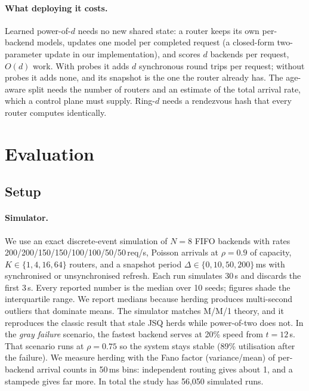 \documentclass[10pt,twocolumn,letterpaper]{article}
\begin{document}
\paragraph{What deploying it costs.} Learned power-of-$d$ needs no new shared state: a router keeps its own per-backend models, updates one
model per completed request (a closed-form two-parameter update in our implementation), and scores $d$ backends per request, $O(d)$ work. With
probes it adds $d$ synchronous round trips per request; without probes it adds none, and its snapshot is the one the router already has. The age-aware split
needs the number of routers and an estimate of the total arrival rate, which a control plane must supply. Ring-$d$ needs a rendezvous hash that
every router computes identically.

\section{Evaluation}
\label{sec:eval}

\subsection{Setup}
\paragraph{Simulator.} We use an exact discrete-event simulation of $N=8$ FIFO
backends with rates 200/200/150/150/100/100/50/50\,req/s, Poisson arrivals at
$\rho=0.9$ of capacity, $K\in\{1,4,16,64\}$ routers, and a snapshot period
$\Delta\in\{0,10,50,200\}$\,ms with synchronised or unsynchronised refresh.
Each run simulates 30\,s and discards the first 3\,s. Every reported number is
the median over 10 seeds; figures shade the interquartile range. We report
medians because herding produces multi-second outliers that dominate means.
The simulator matches M/M/1 theory, and it reproduces the classic result that
stale JSQ herds while power-of-two does not. In the \emph{gray failure}
scenario, the fastest backend serves at 20\% speed from $t{=}12$\,s. That
scenario runs at $\rho=0.75$ so the system stays stable (89\% utilisation
after the failure). We measure herding with the Fano factor (variance/mean)
of per-backend arrival counts in 50\,ms bins: independent routing gives about
1, and a stampede gives far more. In total the study has 56{,}050 simulated
runs.
\end{document}
